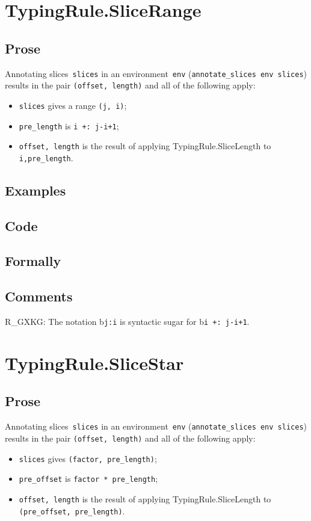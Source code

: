 \documentclass{book}
\begin{document}
\section{TypingRule.SliceRange \label{sec:TypingRule.SliceRange}}

  \subsection{Prose}
      Annotating slices~\texttt{slices} in an environment~\texttt{env}
(\texttt{annotate\_slices env slices}) results in the pair \texttt{(offset,
length)} and all of the following apply:
   \begin{itemize}
   \item \texttt{slices} gives a range \texttt{(j, i)};
   \item \texttt{pre\_length} is \texttt{i +: j-i+1};
   \item \texttt{offset, length} is the result of applying TypingRule.SliceLength to \texttt{i,pre\_length}.
   \end{itemize}

  \subsection{Examples}

  \subsection{Code}

  \subsection{Formally}

  \subsection{Comments}
    R\_GXKG: The notation b\texttt{j:i} is syntactic sugar for b\texttt{i +: j-i+1}.

\section{TypingRule.SliceStar \label{sec:TypingRule.SliceStar}}

  \subsection{Prose}
      Annotating slices~\texttt{slices} in an environment~\texttt{env}
(\texttt{annotate\_slices env slices}) results in the pair \texttt{(offset,
length)} and all of the following apply:
   \begin{itemize}
   \item \texttt{slices} gives \texttt{(factor, pre\_length)};
   \item \texttt{pre\_offset} is \texttt{factor * pre\_length};
   \item \texttt{offset, length} is the result of applying TypingRule.SliceLength to \texttt{(pre\_offset, pre\_length)}.
   \end{itemize}
\end{document}
